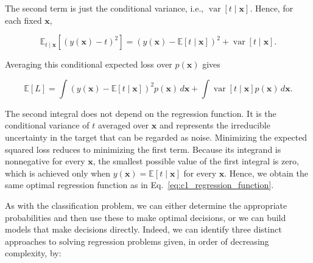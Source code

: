 \documentclass[10pt,twocolumn]{memoir}
\begin{document}
The second term is just the conditional variance, i.e., $\operatorname{var}[t\mid\mathbf{x}]$. Hence, for each fixed $\mathbf{x}$,

\begin{equation}
    \mathbb{E}_{t\mid\mathbf{x}}\left[\left(y(\mathbf{x})-t\right)^2\right] =\left(y(\mathbf{x}) - \mathbb{E}[t\mid\mathbf{x}]\right)^2 + \operatorname{var}[t\mid\mathbf{x}].
\end{equation}

Averaging this conditional expected loss over $p(\mathbf{x})$ gives

\begin{equation}
    \mathbb{E}[L] = \int\left(y(\mathbf{x}) - \mathbb{E}[t\mid\mathbf{x}]\right)^2 p(\mathbf{x})\,d\mathbf{x} + \int\operatorname{var}[t\mid\mathbf{x}]p(\mathbf{x})\,d\mathbf{x}.
\end{equation}

The second integral does not depend on the regression function. It is the conditional variance of $t$ averaged over $\mathbf{x}$ and represents the irreducible uncertainty in the target that can be regarded as noise. Minimizing the expected squared loss reduces to minimizing the first term. Because its integrand is nonnegative for every $\mathbf{x}$, the smallest possible value of the first integral is zero, which is achieved only when $y(\mathbf{x}) = \mathbb{E}[t\mid\mathbf{x}]$ for every $\mathbf{x}$. Hence, we obtain the same optimal regression function as in Eq.~\ref{eq:c1_regression_function}.

As with the classiﬁcation problem, we can either determine the appropriate probabilities and then use these to make optimal decisions, or we can build models that make decisions directly. Indeed, we can identify three distinct approaches to solving regression problems given, in order of decreasing complexity, by:
\end{document}
